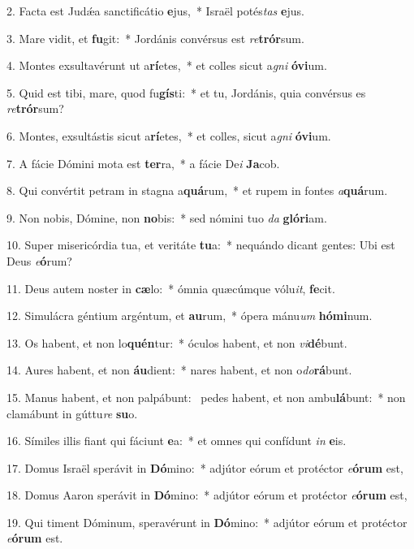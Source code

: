2. Facta est Judǽa sanctificátio \textbf{e}jus,~*  Israël potés\textit{tas} \textbf{e}jus.\

3. Mare vidit, et \textbf{fu}git:~*  Jordánis convérsus est \textit{re}\textbf{trór}sum.\

4. Montes exsultavérunt ut a\textbf{rí}etes,~*  et colles sicut a\textit{gni} \textbf{ó}\textbf{vi}um.\

5. Quid est tibi, mare, quod fu\textbf{gís}ti:~*  et tu, Jordánis, quia convérsus es \textit{re}\textbf{trór}sum?\

6. Montes, exsultástis sicut a\textbf{rí}etes,~*  et colles, sicut a\textit{gni} \textbf{ó}\textbf{vi}um.\

7. A fácie Dómini mota est \textbf{ter}ra,~*  a fácie De\textit{i} \textbf{Ja}cob.\

8. Qui convértit petram in stagna a\textbf{quá}rum,~*  et rupem in fontes \textit{a}\textbf{quá}rum.\

9. Non nobis, Dómine, non \textbf{no}bis:~*  sed nómini tuo \textit{da} \textbf{gló}\textbf{ri}am.\

10. Super misericórdia tua, et veritáte \textbf{tu}a:~*  nequándo dicant gentes: Ubi est Deus \textit{e}\textbf{ó}rum?\

11. Deus autem noster in \textbf{cæ}lo:~*  ómnia quæcúmque vólu\textit{it}, \textbf{fe}cit.\

12. Simulácra géntium argéntum, et \textbf{au}rum,~*  ópera mánu\textit{um} \textbf{hó}\textbf{mi}num.\

13. Os habent, et non lo\textbf{quén}tur:~*  óculos habent, et non \textit{vi}\textbf{dé}bunt.\

14. Aures habent, et non \textbf{áu}dient:~*  nares habent, et non o\textit{do}\textbf{rá}bunt.\

15. Manus habent, et non palpábunt: \dag\  pedes habent, et non ambu\textbf{lá}bunt:~*  non clamábunt in gúttu\textit{re} \textbf{su}o.\

16. Símiles illis fiant qui fáciunt \textbf{e}a:~*  et omnes qui confídunt \textit{in} \textbf{e}is.\

17. Domus Israël sperávit in \textbf{Dó}mino:~*  adjútor eórum et protéctor \textit{e}\textbf{ó}\textbf{rum} est,\

18. Domus Aaron sperávit in \textbf{Dó}mino:~*  adjútor eórum et protéctor \textit{e}\textbf{ó}\textbf{rum} est,\

19. Qui timent Dóminum, speravérunt in \textbf{Dó}mino:~*  adjútor eórum et protéctor \textit{e}\textbf{ó}\textbf{rum} est.\

